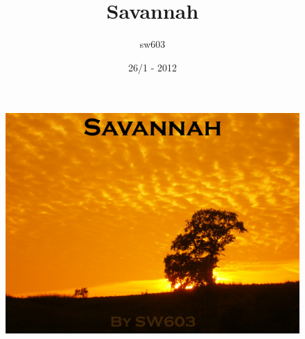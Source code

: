 \documentclass{beamer}
\title{Savannah}
\author{sw603}
\institute{Software}
\date{26/1 - 2012}
\begin{document}
\begin{frame}
\begin{center}
	
\begin{figure}[h]
	\centering
		\includegraphics[width=1.00\textwidth]{Img/forside.jpg}
\end{figure}

\end{center}
\end{frame}
\begin{frame}
\titlepage
\end{frame}





\end{document}
